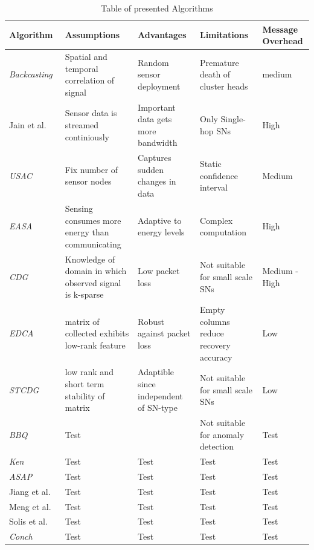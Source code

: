 \begin{table}[h]
\caption{Table of presented Algorithms \label{table:algorithm table}}
    \begin{tabular} { |p{3.5cm}||p{3cm}|p{3cm}|p{3cm}|p{2.5cm}| }

    \hline
    Algorithm& Assumptions & Advantages & Limitations & Message Overhead\\
    \hline

    \textit{Backcasting}~\cite{willett2004backcasting} & Spatial and temporal
    correlation of signal & Random sensor deployment & Premature death of
    cluster heads & medium\\

    Jain et al.~\cite{jain2004adaptive} & Sensor data is streamed continiously &
    Important data gets more bandwidth & Only Single-hop \acp{SN} & High\\

    \textit{USAC}~\cite{padhy2006utility}& Fix number of sensor nodes & Captures
    sudden changes in data & Static confidence
    interval~\cite{kho2007decentralised} & Medium\\

    \textit{EASA}~\cite{srbinovski2016energy}& Sensing consumes more energy
    than communicating & Adaptive to energy levels & Complex computation &
    High\\

    \textit{CDG}~\cite{luo2009compressive}& Knowledge of domain in which
    observed signal is k-sparse & Low packet loss & Not suitable for small
    scale \acp{SN} & Medium - High\\

    \textit{EDCA}~\cite{cheng2010efficient}& matrix of collected exhibits
    low-rank feature & Robust against packet loss & Empty columns reduce
    recovery accuracy~\cite{cheng2013stcdg} & Low\\

    \textit{STCDG}~\cite{cheng2013stcdg}& low rank and short term stability of
    matrix & Adaptible since independent of \ac{SN}-type & Not suitable for
    small scale \acp{SN}~\cite{yi2015partial} & Low\\

    \textit{BBQ}~\cite{deshpande2004model}& Test &  & Not suitable for
    anomaly detection & Test\\

    \textit{Ken}~\cite{chu2006approximate}& Test & Test & Test & Test\\
    \textit{ASAP}~\cite{gedik2007asap}& Test & Test & Test & Test\\
    Jiang et al.~\cite{jiang2011prediction}& Test & Test & Test & Test\\
    Meng et al.~\cite{meng2004event}& Test & Test & Test & Test\\
    Solis et al.~\cite{solis2005efficient}& Test & Test & Test & Test\\
    \textit{Conch}~\cite{silberstein2006constraint}& Test & Test & Test & Test\\
    \hline
    \end{tabular}
\end{table}

